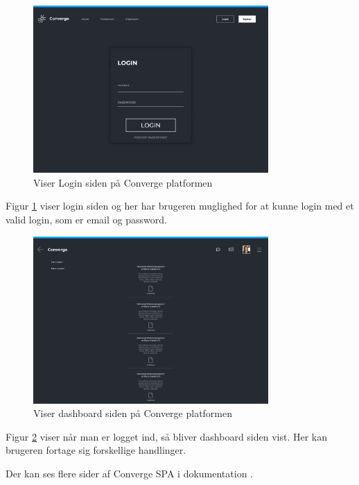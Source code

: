 \begin{figure}[H]
    \centering
  \includegraphics[width=0.8\textwidth]{Billeder/Login.pdf}
  \caption{Viser Login siden på Converge platformen}
  \label{fig:login}
  \end{figure}

Figur \ref{fig:login} viser login siden og her har brugeren muglighed for at kunne login med et valid login, som er
email og password.

\begin{figure}[H]
    \centering
  \includegraphics[width=0.8\textwidth]{Billeder/Dashboard.pdf}
  \caption{Viser dashboard siden på Converge platformen}
  \label{fig:dashboard}
  \end{figure}

Figur \ref{fig:dashboard} viser når man er logget ind, så bliver dashboard siden vist. Her kan
brugeren fortage sig forskellige handlinger. 

Der kan ses flere sider af Converge SPA i dokumentation \cite{system-interface}.